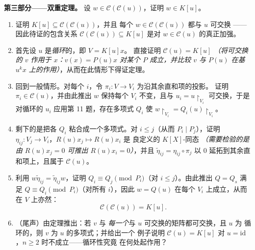 \begin{problem}
\medskip
\noindent\textbf{第三部分——双重定理。}
设 $w \in \mathcal C(\mathcal C(u))$，证明 $w \in K[u]$。
\begin{enumerate}[resume]
  \item 证明 $K[u] \subseteq \mathcal C(\mathcal C(u))$，并且
        每个 $w \in \mathcal C(\mathcal C(u))$ 都与 $u$ 可交换
——因此待证的包含关系
        $\mathcal C(\mathcal C(u)) \subseteq K[u]$ 是对
        $w \in \mathcal C(u)$ 的真正加强。
  \item 首先设 $u$ 是\emph{循环}的，即 $V = K[u]x$。
        直接证明 $\mathcal C(u) = K[u]$
        \emph{（将可交换的 $v$ 作用于 $x$：$v(x) = P(u)x$
        对某个 $P$ 成立，并比较 $v$ 与 $P(u)$
        在基 $u^k x$ 上的作用）}，从而在此情形下得证定理。
  \item 回到一般情形。对每个 $i$，令 $\pi_i\colon
        V \to V_i$ 为沿其余直和项的投影。
        证明 $\pi_i \in \mathcal C(u)$，并由此推出 $w$
        保持每个 $V_i$ 不变，且与 $u_i =
        u\restriction_{V_i}$ 可交换，于是
        对循环的 $u_i$ 应用第 11 题，存在多项式 $Q_i$ 使
        $w\restriction_{V_i} = Q_i(u)\restriction_{V_i}$。
  \item 剩下的是把各 $Q_i$ 粘合成一个多项式。对 $i
        \leq j$（从而 $P_i \mid P_j$），证明 $\eta_{ij} \colon
        V_j \to V_i$，$R(u)x_j \mapsto R(u)x_i$ 是
        良定义的 $K[X]$-同态 \emph{（需要检验的是
        由 $R(u)x_j = 0$ 可推出 $R(u)x_i = 0$）}，并且
        $\tilde\eta_{ij} = \eta_{ij}\circ\pi_j$ 以 $0$
        延拓到其余直和项上，且属于 $\mathcal C(u)$。
  \item 利用 $w\tilde\eta_{ij} = \tilde\eta_{ij}w$，证明 $Q_i
        \equiv Q_j \pmod{P_i}$（对 $i \leq j$）。由此推出 $Q =
        Q_s$
        满足 $Q \equiv Q_i \pmod {P_i}$（对所有 $i$），因此
        $w = Q(u)$ 在每个 $V_i$ 上成立，从而在 $V$ 上亦然：
        \[
        \boxed{\ \mathcal C(\mathcal C(u)) = K[u].\ }
        \]
  \item （尾声）由定理推出：若 $v$ 与
        \emph{每一个}与 $u$ 可交换的矩阵都可交换，且 $u$ 为
        循环的，则 $v$ 为 $u$ 的多项式；并给出一个
        例子说明 $\mathcal C(u) = K[u]$ 对 $u =
        \mathrm{id}$，$n \geq 2$ 时不成立——循环性究竟
        在何处起作用？
\end{enumerate}


\end{problem}
